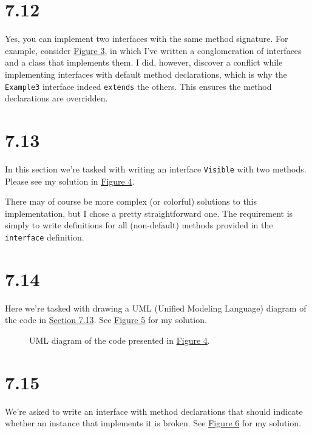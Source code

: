 \documentclass[leqno, 11pt]{article}
\newcommand{\iftcodefigure}[3]{%
  \begin{codefigure}
    \label{#1}
    \addtocounter{figure}{-1}
    
  \end{codefigure}
}
\begin{document}
\section{7.12}
Yes, you can implement two interfaces with the same method signature. For example, consider \hyperref[fig:three]{Figure 3}, in which I've written a conglomeration of interfaces and a class that implements them. I did, however, discover a conflict while implementing interfaces with default method declarations, which is why the \texttt{Example3} interface indeed \texttt{extends} the others. This ensures the method declarations are overridden.
\iftcodefigure{fig:three}{Implementer.java. This example also demonstrates how the \texttt{main} method, which is a \texttt{static} method, is indeed not paired with any particular instance of \texttt{Implementer}; instead, we must create an instance to act upon.}{%
  /home/brandon/eclipse-workspace/ift_194_hw/src/hw_4/Implementer.java}
\section{7.13}
\label{sec:seventhirteen}
In this section we're tasked with writing an interface \texttt{Visible} with two methods. Please see my solution in \hyperref[fig:four]{Figure 4}.
\iftcodefigure{fig:four}{ImplementVisibile.java}{%
  /home/brandon/eclipse-workspace/ift_194_hw/src/hw_4/ImplementVisible.java}
There may of course be more complex (or colorful) solutions to this implementation, but I chose a pretty straightforward one. The requirement is simply to write definitions for all (non-default) methods provided in the \texttt{interface} definition.
\section{7.14}
Here we're tasked with drawing a UML (Unified Modeling Language) diagram of the code in \hyperref[sec:seventhirteen]{Section 7.13}. See \hyperref[fig:five]{Figure 5} for my solution.
\begin{figure}[t]
  \centering
  \label{fig:five}
  \caption{UML diagram of the code presented in \hyperref[fig:four]{Figure 4}.}
\end{figure}
\section{7.15}
We're asked to write an interface with method declarations that should indicate whether an instance that implements it is broken. See \hyperref[fig:six]{Figure 6} for my solution.
\iftcodefigure{fig:six}{Something.java}{%
  /home/brandon/eclipse-workspace/ift_194_hw/src/hw_4/Something.java}
\end{document}
